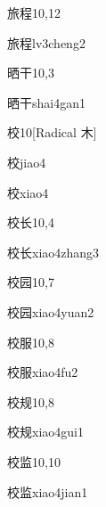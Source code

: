 \begin{entry}{旅程}{10,12}
  \begin{phonetics}{旅程}{lv3cheng2}
  \end{phonetics}
\end{entry}

\begin{entry}{晒干}{10,3}
  \begin{phonetics}{晒干}{shai4gan1}
  \end{phonetics}
\end{entry}

\begin{entry}{校}{10}[Radical 木]
  \begin{phonetics}{校}{jiao4}
  \end{phonetics}
  \begin{phonetics}{校}{xiao4}
  \end{phonetics}
\end{entry}

\begin{entry}{校长}{10,4}
  \begin{phonetics}{校长}{xiao4zhang3}
  \end{phonetics}
\end{entry}

\begin{entry}{校园}{10,7}
  \begin{phonetics}{校园}{xiao4yuan2}
  \end{phonetics}
\end{entry}

\begin{entry}{校服}{10,8}
  \begin{phonetics}{校服}{xiao4fu2}
  \end{phonetics}
\end{entry}

\begin{entry}{校规}{10,8}
  \begin{phonetics}{校规}{xiao4gui1}
  \end{phonetics}
\end{entry}

\begin{entry}{校监}{10,10}
  \begin{phonetics}{校监}{xiao4jian1}
  \end{phonetics}
\end{entry}

